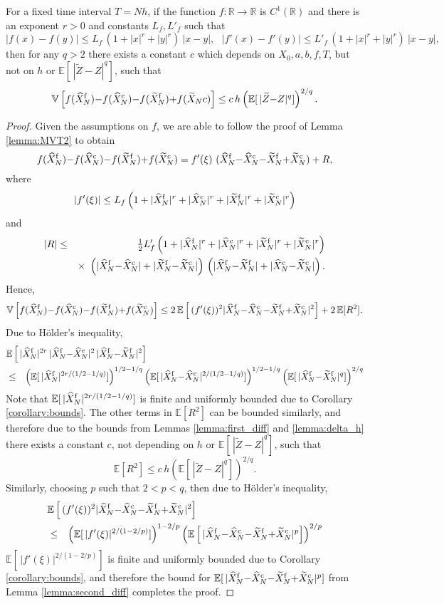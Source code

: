 \documentclass[review]{siamart190516}
\def \RR {{\mathbb{R}}}
\def \EE {{\mathbb{E}}}
\def \VV {{\mathbb{V}}}
\def \tZ {{\widetilde{Z}}}
\def \tX {{\widetilde{X}}}
\def \tXf  {{\widetilde{X}^{\rm f}}}
\def \tXc  {{\widetilde{X}^{\rm c}}}
\def \hXf {{\widehat{X}^{\rm f}}}
\def \hXc {{\widehat{X}^{\rm c}}}
\newcommand{\fracs}[2]{{\textstyle \frac{#1}{#2}}}
\begin{document}
\begin{lemma}
\label{lemma:polynomial}
For a fixed time interval $T\!=\!N h$, if the function $f: \RR \rightarrow \RR$
is $C^1(\RR)$ and there is an exponent $r>0$ and constants $L_f, L'_f$ such that
\[
|f(x)-f(y)| \leq L_f\, (1+|x|^r+|y|^r)\ |x{-}y|, ~~~
|f'(x)-f'(y)| \leq L'_f\, (1+|x|^r+|y|^r)\ |x{-}y|,
\]
then for any $q\!>\!2$ there exists a constant $c$ which depends on 
$X_0, a, b, f, T$, but not on $h$ or $\EE[\, |\tZ{-}Z|^q]$, such that
\[
\VV\left[ f(\hXf_N){-}f(\hXc_N) {-} f(\tXf_N){+}f(\tX_Nc)\right] 
\leq c\, h \left(\EE[\, |\tZ{-}Z|^q]\right)^{2/q}.
\]
\end{lemma}
\begin{proof}
Given the assumptions on $f$, we are able to follow the proof 
of Lemma \ref{lemma:MVT2} to obtain
\[
f(\hXf_N){-}f(\hXc_N) {-} f(\tXf_N){+}f(\tXc_N)
= f'(\xi)\ (\hXf_N{-}\hXc_N{-}\tXf_N{+}\tXc_N)
+ R,
\]
where
\[
|f'(\xi)| \leq  L_f \left(1 + |\hXf_N|^r + |\hXc_N|^r + |\tXf_N|^r + |\tXc_N|^r \right)
\]
and
\begin{eqnarray*}
|R| &\leq& \fracs{1}{2} L'_f \left(1 + |\hXf_N|^r + |\hXc_N|^r + |\tXf_N|^r + |\tXc_N|^r \right)
\\ && \times \  \left( |\hXf_N{-}\hXc_N| + |\tXf_N{-}\tXc_N| \right)\, 
                \left( |\hXf_N{-}\tXf_N| + |\hXc_N{-}\tXc_N| \right).
\end{eqnarray*}
Hence,
\[
\VV\left[ f(\hXf_N){-}f(\hXc_N) {-} f(\tXf_N){+}f(\tXc_N)\right] \leq 
2\, \EE\left[\, (f'(\xi))^2|\hXf_N{-}\hXc_N{-}\tXf_N{+}\tXc_N|^2\right]
+ 2\, \EE[R^2].
\]
Due to H\"older's inequality, 
\begin{eqnarray*}
\lefteqn{
\EE\left[\, |\hXf_N|^{2r} \, |\hXf_N{-}\hXc_N|^2 \, |\hXf_N{-}\tXf_N|^2 \right] 
}
\\ &\leq& 
\left( \EE[\,|\hXf_N|^{2r/(1/2 - 1/q)}]\right)^{1/2 - 1/q}
\left( \EE[\,|\hXf_N{-}\hXc_N|^{2/(1/2 - 1/q)}]\right)^{1/2 - 1/q}
\left( \EE[\,|\hXf_N{-}\tXf_N|^q] \right)^{2/q}
\end{eqnarray*}
Note that $\EE[ \, |\hXf_N|^{2r/(1/2 - 1/q)}]$ is finite and uniformly bounded due to 
Corollary \ref{corollary:bounds}.
The other terms in $\EE[R^2]$ can be bounded similarly, and therefore due to the bounds
from Lemmas \ref{lemma:first_diff} and \ref{lemma:delta_h} there exists a constant $c$,
not depending on $h$ or $\EE[\,|\tZ{-}Z|^q]$, such that
\[
\EE[R^2] \leq c\, h \left(\EE[\,|\tZ{-}Z|^q]\right)^{2/q}.
\]
Similarly, choosing $p$ such that $2\!<\!p\!<\!q$, then due to H\"older's inequality, 
\begin{eqnarray*}
\lefteqn{
\EE\left[\, (f'(\xi))^2|\hXf_N{-}\hXc_N{-}\tXf_N{+}\tXc_N|^2\right]
}
\\ &\leq&
\left(\EE[ \, |f'(\xi)|^{2/(1-2/p)}] \right)^{1-2/p}
\left(\EE\left[\,|\hXf_N{-}\hXc_N{-}\tXf_N{+}\tXc_N|^p\right] \right)^{2/p}
\end{eqnarray*}
$\EE[ \, |f'(\xi)|^{2/(1-2/p)}]$ is finite and uniformly bounded due to 
Corollary \ref{corollary:bounds}, and therefore the bound for 
$\EE[\, |\hXf_N{-}\hXc_N{-}\tXf_N{+}\tXc_N|^p]$ from
Lemma \ref{lemma:second_diff} completes the proof.
\end{proof}
\end{document}

